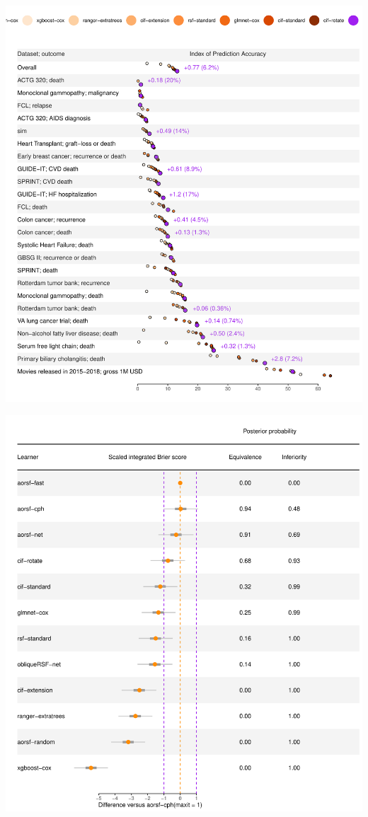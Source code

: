 \documentclass[twoside,11pt]{article}\usepackage[]{graphicx}\usepackage[]{xcolor}
\makeatletter
\def\maxwidth{ %
  \ifdim\Gin@nat@width>\linewidth
    \linewidth
  \else
    \Gin@nat@width
  \fi
}
\newenvironment{knitrout}{}{} %
\makeatother
\begin{document}
\begin{knitrout}
\color{fgcolor}
\includegraphics[width=\maxwidth]{figure/unnamed-chunk-2-1} 
\end{knitrout}


\begin{knitrout}
\color{fgcolor}
\includegraphics[width=\maxwidth]{figure/unnamed-chunk-3-1} 
\end{knitrout}
\end{document}
